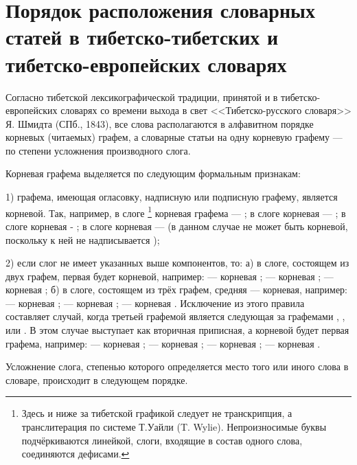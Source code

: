 \section{Порядок расположения словарных статей в тибетско-тибетских и тибетско-европейских словарях}

Согласно тибетской лексикографической традиции, принятой и в тибетско-европейских словарях со времени выхода в свет <<Тибетско-русского словаря>> Я. Шмидта (СПб., 1843), все слова располагаются в алфавитном порядке корневых (читаемых) графем, а словарные статьи на одну корневую графему --- по степени усложнения производного слога.

Корневая графема выделяется по следующим формальным признакам:

1) графема, имеющая огласовку, надписную или подписную графему, является корневой. Так, например, в слоге \footnote[17]{Здесь и ниже за тибетской графикой следует не транскрипция, а транслитерация по системе Т.Уайли (T. Wylie). Непроизносимые буквы подчёркиваются линейкой, слоги, входящие в состав одного слова, соединяются дефисами.} корневая графема --- ; в слоге  корневая --- ; в слоге	 корневая - ; в слоге  корневая ---  (в данном случае  не может быть корневой, поскольку к ней не надписывается );

2)	если слог не имеет указанных выше компонентов, то: а) в слоге, состоящем из двух графем, первая будет корневой, например:
 --- корневая ;
 --- корневая ;
 ---	корневая ;
б) в слоге, состоящем из трёх графем, средняя --- корневая, например:
 --- корневая ;
 --- корневая ;
 --- корневая .
Исключение из этого правила составляет случай, когда третьей графемой является  следующая за графемами , ,  или . В этом случае  выступает как вторичная приписная, а корневой будет первая графема, например:
 --- корневая ;
 --- корневая ;
 --- корневая ;
 --- корневая .

Усложнение слога, степенью которого определяется место того или иного слова в словаре, происходит в следующем порядке.

